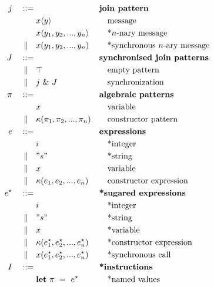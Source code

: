 \begin{figure}
\begin{align*}
j\quad ::={}&             && \textbf{join pattern} \\
            & x\langle y \rangle
                           && \quad\textrm{message} \\
            & x\langle y_1, y_2, ..., y_n \rangle
                           && \quad\textrm{*$n$-nary message} \\
\alt\quad& x(y_1, y_2, ..., y_n)
                           && \quad\textrm{*synchronous $n$-ary message} \\
J\quad ::={}&              && \textbf{synchronised join patterns}\\
\alt\quad& \top               && \quad\textrm{empty pattern}\\
\alt\quad& j ~\&~ J
                           && \quad\textrm{synchronization} \\
\pi\quad ::={}&            && \textbf{algebraic patterns} \\
         & x               && \quad\textrm{variable} \\
\alt\quad& \kappa(\pi_1, \pi_2, ..., \pi_n)
                           && \quad\textrm{constructor pattern} \\
e\quad ::={}&              && \textbf{expressions} \\
         & i               && \quad\textrm{*integer} \\
\alt\quad& " s "         && \quad\textrm{*string} \\
\alt\quad& x               && \quad\textrm{variable} \\
\alt\quad& \kappa(e_1, e_2, ..., e_n)
                           && \quad\textrm{constructor expression} \\
e^\star\quad ::={}&         && \textbf{*sugared expressions} \\
         & i               && \quad\textrm{*integer} \\
\alt\quad& " s "         && \quad\textrm{*string} \\
\alt\quad& x               && \quad\textrm{*variable} \\
\alt\quad& \kappa(e^\star_1, e^\star_2, ..., e^\star_n)
                           && \quad\textrm{*constructor expression} \\
\alt\quad& x(e^\star_1, e^\star_2, ..., e^\star_ n)
                           && \quad\textrm{*synchronous call} \\
I\quad ::={}&              && \textbf{*instructions} \\
         & \mathbf{let}~\pi~=~e^\star
                           && \quad\textrm{*named values} \\

\end{align*}
\end{figure}
